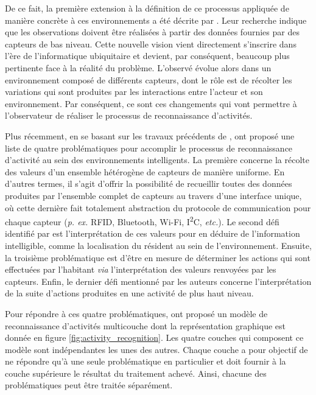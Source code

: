 {{De ce fait, la première extension à la définition de ce processus appliquée de manière concrète à ces environnements a été décrite par \cite{Patterson2005}. Leur recherche indique que les observations doivent être réalisées à partir des données fournies par des capteurs de bas niveau. Cette nouvelle vision vient directement s'inscrire dans l'ère de l'informatique ubiquitaire \citep{Weiser1991} et devient, par conséquent, beaucoup plus pertinente face à la réalité du problème. L'observé évolue alors dans un environnement composé de différents capteurs, dont le rôle est de récolter les variations qui sont produites par les interactions entre l'acteur et son environnement. Par conséquent, ce sont ces changements qui vont permettre à l'observateur de réaliser le processus de reconnaissance d'activités.

Plus récemment, en se basant sur les travaux précédents de \cite{Patterson2005}, \cite{Roy2013} ont proposé une liste de quatre problématiques pour accomplir le processus de reconnaissance d'activité au sein des environnements intelligents. La première concerne la récolte des valeurs d'un ensemble hétérogène de capteurs de manière uniforme. En d'autres termes, il s'agit d'offrir la possibilité de recueillir toutes des données produites par l'ensemble complet de capteurs au travers d'une interface unique, où cette dernière fait totalement abstraction du protocole de communication pour chaque capteur (\textit{p. ex.} RFID, Bluetooth, Wi-Fi, I\textsuperscript{2}C, \textit{etc.}). Le second défi identifié par \cite{Roy2013} est l'interprétation de ces valeurs pour en déduire de l'information intelligible, comme la localisation du résident au sein de l'environnement. Ensuite, la troisième problématique est d'être en mesure de déterminer les actions qui sont effectuées par l'habitant \textit{via} l'interprétation des valeurs renvoyées par les capteurs. Enfin, le dernier défi mentionné par les auteurs concerne l'interprétation de la suite d’actions produites en une activité de plus haut niveau. 

Pour répondre à ces quatre problématiques, \cite{Roy2013} ont proposé un modèle de reconnaissance d'activités multicouche dont la représentation graphique est donnée en figure \ref{fig:activity_recognition}. Les quatre couches qui composent ce modèle sont indépendantes les unes des autres. Chaque couche a pour objectif de ne répondre qu'à une seule problématique en particulier et doit fournir à la couche supérieure le résultat du traitement achevé. Ainsi, chacune des problématiques peut être traitée séparément.

}}
